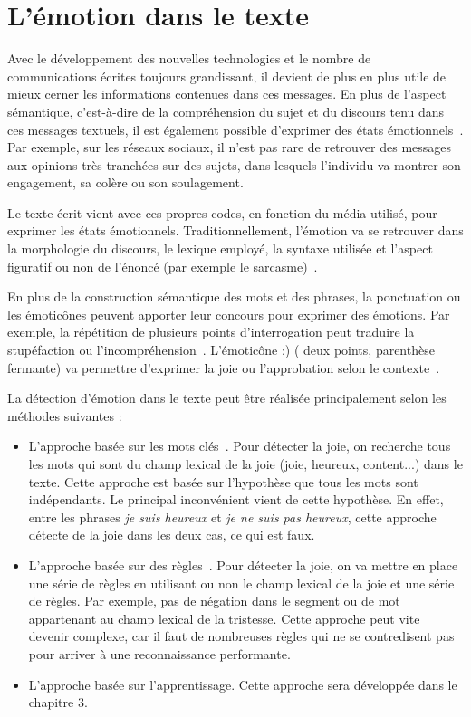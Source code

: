 \section{L'émotion dans le texte}
Avec le développement des nouvelles technologies et le nombre de communications écrites toujours grandissant, il devient de plus en plus utile de mieux cerner les informations contenues dans ces messages. En plus de l'aspect sémantique, c'est-à-dire de la compréhension du sujet et du discours tenu dans ces messages textuels, il est également possible d'exprimer des états émotionnels~\cite{Hancock2007,SchwarzFriesel2015}. Par exemple, sur les réseaux sociaux, il n'est pas rare de retrouver des messages aux opinions très tranchées sur des sujets, dans lesquels l'individu va montrer son engagement, sa colère ou son soulagement.

Le texte écrit vient avec ces propres codes, en fonction du média utilisé, pour exprimer les états émotionnels. Traditionnellement, l'émotion va se retrouver dans la morphologie du discours, le lexique employé, la syntaxe utilisée et l'aspect figuratif ou non de l'énoncé (par exemple le sarcasme)~\cite{Sailunaz2018}.

En plus de la construction sémantique des mots et des phrases, la ponctuation ou les émoticônes peuvent apporter leur concours pour exprimer des émotions. Par exemple, la répétition de plusieurs points d'interrogation peut traduire la stupéfaction ou l'incompréhension~\cite{Thurlow2013}. L’émoticône :) ( deux points, parenthèse fermante) va permettre d'exprimer la joie ou l'approbation selon le contexte~\cite{Provine2007}.

La détection d'émotion dans le texte peut être réalisée principalement selon les méthodes suivantes :
\begin{itemize}
  \item L'approche basée sur les mots clés~\cite{Ma2005,Liu2003}. Pour détecter la joie, on recherche tous les mots qui sont du champ lexical de la joie (joie, heureux, content...) dans le texte. Cette approche est basée sur l'hypothèse que tous les mots sont indépendants. Le principal inconvénient vient de cette hypothèse. En effet, entre les phrases \textit{je suis heureux} et \textit{je ne suis pas heureux}, cette approche détecte de la joie dans les deux cas, ce qui est faux.
  \item L'approche basée sur des règles~\cite{AlMasum2007,Chaumartin2007}. Pour détecter la joie, on va mettre en place une série de règles en utilisant ou non le champ lexical de la joie et une série de règles. Par exemple, pas de négation dans le segment ou de mot appartenant au champ lexical de la tristesse. Cette approche peut vite devenir complexe, car il faut de nombreuses règles qui ne se contredisent pas pour arriver à une reconnaissance performante.
  \item L'approche basée sur l'apprentissage. Cette approche sera développée dans le chapitre 3.
\end{itemize}

